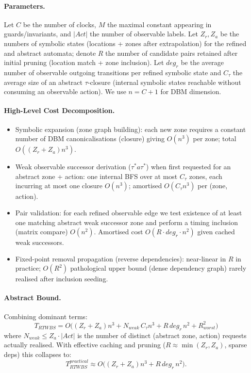 \paragraph{Parameters.} Let $C$ be the number of clocks, $M$ the maximal constant appearing in guards/invariants, and $|Act|$ the number of observable labels. Let $Z_r, Z_a$ be the numbers of symbolic states (locations + zones after extrapolation) for the refined and abstract automata; denote $R$ the number of candidate pairs retained after initial pruning (location match + zone inclusion). Let $deg_r$ be the average number of observable outgoing transitions per refined symbolic state and $C_\tau$ the average size of an abstract $\tau$-closure (internal symbolic states reachable without consuming an observable action). We use $n = C+1$ for DBM dimension.

\paragraph{High-Level Cost Decomposition.}
\begin{itemize}[leftmargin=1.2em]
  \item Symbolic expansion (zone graph building): each new zone requires a constant number of DBM canonicalisations (closure) giving $O(n^3)$ per zone; total $O((Z_r+Z_a) n^3)$.
  \item Weak observable successor derivation ($\tau^* a \tau^*$) when first requested for an abstract zone + action: one internal BFS over at most $C_\tau$ zones, each incurring at most one closure $O(n^3)$; amortised $O(C_\tau n^3)$ per (zone, action).
  \item Pair validation: for each refined observable edge we test existence of at least one matching abstract weak successor zone and perform a timing inclusion (matrix compare) $O(n^2)$. Amortised cost $O(R\cdot deg_r \cdot n^2)$ given cached weak successors.
  \item Fixed-point removal propagation (reverse dependencies): near-linear in $R$ in practice; $O(R^2)$ pathological upper bound (dense dependency graph) rarely realised after inclusion seeding.
\end{itemize}

\paragraph{Abstract Bound.} Combining dominant terms:
\[
  T_{RTWBS} = O\Big( (Z_r+Z_a) n^3 + N_{weak}\, C_\tau n^3 + R\, deg_r\, n^2 + R^2_{worst} \Big)
\]
where $N_{weak} \le Z_a \cdot |Act|$ is the number of distinct (abstract zone, action) requests actually realised. With effective caching and pruning ($R \approx \min(Z_r,Z_a)$, sparse deps) this collapses to:
\[
  T_{RTWBS}^{practical} \approx O\Big((Z_r+Z_a) n^3 + R\, deg_r\, n^2 \Big).
\]

